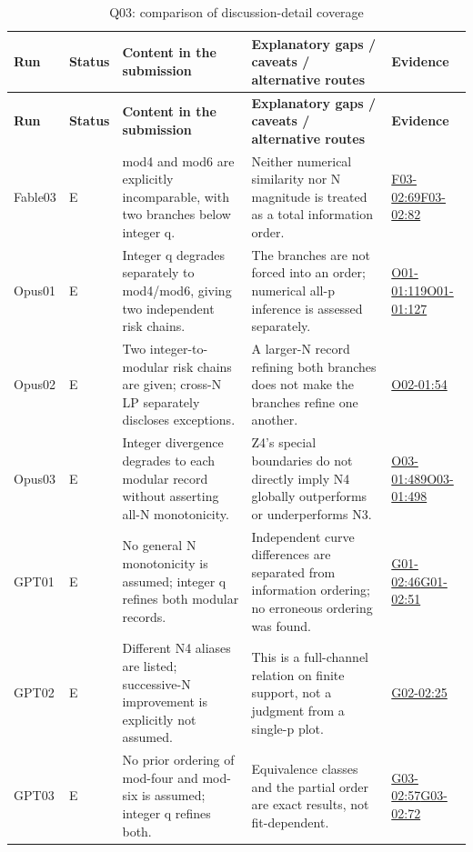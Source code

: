 \documentclass[11pt,a4paper]{article}
\begin{document}
{\fontsize{9.0}{12.6}\selectfont
\setlength{\tabcolsep}{2.5pt}
\begin{longtable}{>{\raggedright\arraybackslash}p{}>{\raggedright\arraybackslash}p{}>{\raggedright\arraybackslash}p{}>{\raggedright\arraybackslash}p{}>{\raggedright\arraybackslash}p{}}
\caption{Q03: comparison of discussion-detail coverage}\\
\toprule
\textbf{Run} & \textbf{Status} & \textbf{Content in the submission} & \textbf{Explanatory gaps /\allowbreak{} caveats /\allowbreak{} alternative routes} & \textbf{Evidence}\tabularnewline
\midrule
\endfirsthead
\toprule
\textbf{Run} & \textbf{Status} & \textbf{Content in the submission} & \textbf{Explanatory gaps /\allowbreak{} caveats /\allowbreak{} alternative routes} & \textbf{Evidence}\tabularnewline
\midrule
\endhead
{}Fable03 & E & mod4 and mod6 are explicitly incomparable,\allowbreak{} with two branches below integer q. & Neither numerical similarity nor N magnitude is treated as a total information order. & \hyperref[src:F03-02]{F03-02:69}\newline \hyperref[src:F03-02]{F03-02:82}\tabularnewline
{}Opus01 & E & Integer q degrades separately to mod4/\allowbreak{}mod6,\allowbreak{} giving two independent risk chains. & The branches are not forced into an order; numerical all-p inference is assessed separately. & \hyperref[src:O01-01]{O01-01:119}\newline \hyperref[src:O01-01]{O01-01:127}\tabularnewline
{}Opus02 & E & Two integer-to-modular risk chains are given; cross-N LP separately discloses exceptions. & A larger-N record refining both branches does not make the branches refine one another. & \hyperref[src:O02-01]{O02-01:54}\tabularnewline
{}Opus03 & E & Integer divergence degrades to each modular record without asserting all-N monotonicity. & Z4’s special boundaries do not directly imply N4 globally outperforms or underperforms N3. & \hyperref[src:O03-01]{O03-01:489}\newline \hyperref[src:O03-01]{O03-01:498}\tabularnewline
{}GPT01 & E & No general N monotonicity is assumed; integer q refines both modular records. & Independent curve differences are separated from information ordering; no erroneous ordering was found. & \hyperref[src:G01-02]{G01-02:46}\newline \hyperref[src:G01-02]{G01-02:51}\tabularnewline
{}GPT02 & E & Different N4 aliases are listed; successive-N improvement is explicitly not assumed. & This is a full-channel relation on finite support,\allowbreak{} not a judgment from a single-p plot. & \hyperref[src:G02-02]{G02-02:25}\tabularnewline
{}GPT03 & E & No prior ordering of mod-four and mod-six is assumed; integer q refines both. & Equivalence classes and the partial order are exact results,\allowbreak{} not fit-dependent. & \hyperref[src:G03-02]{G03-02:57}\newline \hyperref[src:G03-02]{G03-02:72}\tabularnewline
\bottomrule
\end{longtable}
}
\end{document}
